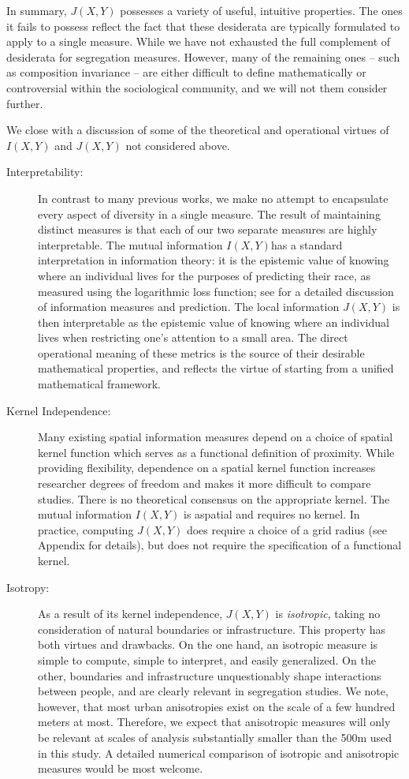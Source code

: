 	In summary, $J(X,Y)$ possesses a variety of useful, intuitive properties. The ones it fails to possess reflect the fact that these desiderata are typically formulated to apply to a single measure. While we have not exhausted the full complement of desiderata for segregation measures. However, many of the remaining ones -- such as composition invariance -- are either difficult to define mathematically or controversial within the sociological community, and we will not them consider further. 

	We close with a discussion of some of the theoretical and operational virtues of $I(X,Y)$ and $J(X,Y)$ not considered above. 
	\begin{description}
		\item[Interpretability:] In contrast to many previous works, we make no attempt to encapsulate every aspect of diversity in a single measure. The result of maintaining distinct measures is that each of our two separate measures are highly interpretable. The mutual information $I(X,Y)$has a standard interpretation in information theory: it is the epistemic value of knowing where an individual lives for the purposes of predicting their race, as measured using the logarithmic loss function; see \cite{Cover1991} for a detailed discussion of information measures and prediction. The local information $J(X,Y)$ is then interpretable as the epistemic value of knowing where an individual lives when restricting one's attention to a small area. The direct operational meaning of these metrics is the source of their desirable mathematical properties, and reflects the virtue of starting from a unified mathematical framework.  
		\item[Kernel Independence:] Many existing spatial information measures depend on a choice of spatial kernel function which serves as a functional definition of proximity. While providing flexibility, dependence on a spatial kernel function increases researcher degrees of freedom and makes it more difficult to compare studies. There is no theoretical consensus on the appropriate kernel. The mutual information $I(X,Y)$ is aspatial and requires no kernel. In practice, computing $J(X,Y)$ does require a choice of a grid radius (see Appendix for details), but does not require the specification of a functional kernel. 
		\item[Isotropy:] As a result of its kernel independence, $J(X,Y)$ is \emph{isotropic}, taking no consideration of natural boundaries or infrastructure. This property has both virtues and drawbacks. On the one hand, an isotropic measure is simple to compute, simple to interpret, and easily generalized. On the other, boundaries and infrastructure unquestionably shape interactions between people, and are clearly relevant in segregation studies. We note, however, that most urban anisotropies exist on the scale of a few hundred meters at most. Therefore, we expect that anisotropic measures will only be relevant at scales of analysis substantially smaller than the 500m used in this study. A detailed numerical comparison of isotropic and anisotropic measures would be most welcome. 

\end{description}

